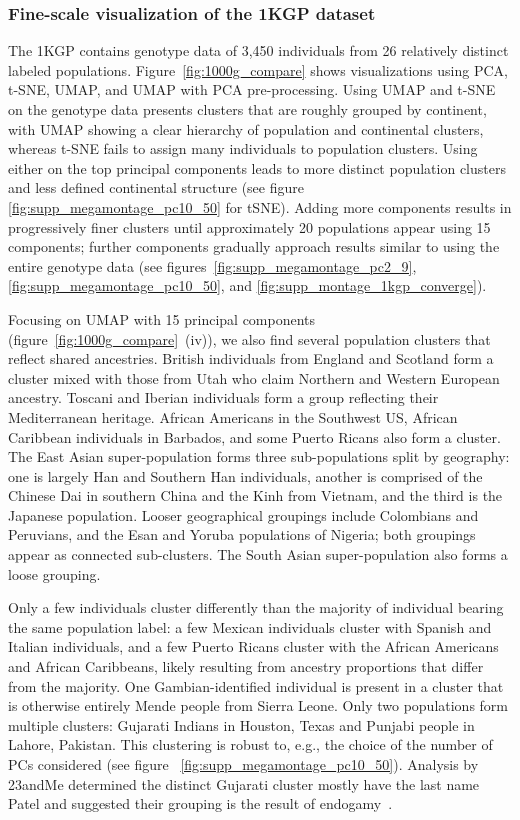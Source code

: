 \documentclass[12pt]{pnas-new}
\begin{document}
\subsubsection*{Fine-scale visualization of the 1KGP dataset} The 1KGP contains genotype data of 3,450 individuals from 26 relatively distinct labeled populations\cite{10002015global}. Figure~\ref{fig:1000g_compare} shows visualizations using PCA, t-SNE, UMAP, and UMAP with PCA pre-processing. Using UMAP and t-SNE on the genotype data presents clusters that are roughly grouped by continent, with UMAP showing a clear hierarchy of population and continental clusters, whereas t-SNE fails to assign many individuals to population clusters. Using either on the top principal components leads to more distinct population clusters and less defined continental structure (see figure \ref{fig:supp_megamontage_pc10_50} for tSNE). Adding more components results in progressively finer clusters until approximately 20 populations appear using 15 components; further components gradually approach results similar to using the entire genotype data (see figures~\ref{fig:supp_megamontage_pc2_9}, \ref{fig:supp_megamontage_pc10_50}, and \ref{fig:supp_montage_1kgp_converge}). 

Focusing on UMAP with 15 principal components (figure~\ref{fig:1000g_compare}~(iv)), we also find several population clusters that reflect shared ancestries. British individuals from England and Scotland form a cluster mixed with those from Utah who claim Northern and Western European ancestry. Toscani and Iberian individuals form a group reflecting their Mediterranean heritage. African Americans in the Southwest US, African Caribbean individuals in Barbados, and some Puerto Ricans also form a cluster. The East Asian super-population forms three sub-populations split by geography: one is largely Han and Southern Han individuals, another is comprised of the Chinese Dai in southern China and the Kinh from Vietnam, and the third is the Japanese population. Looser geographical groupings include Colombians and Peruvians, and the Esan and Yoruba populations of Nigeria; both groupings appear as connected sub-clusters. The South Asian super-population also forms a loose grouping. 

Only a few individuals cluster differently than the majority of individual bearing the same population label: a few Mexican individuals cluster with Spanish and Italian individuals, and a few Puerto Ricans cluster with the African Americans and African Caribbeans, likely resulting from ancestry proportions that differ from the majority. One Gambian-identified individual is present in a cluster that is otherwise entirely Mende people from Sierra Leone. Only two populations form multiple clusters: Gujarati Indians in Houston, Texas and Punjabi people in Lahore, Pakistan. This clustering is robust to, e.g., the choice of the number of PCs considered (see figure ~\ref{fig:supp_megamontage_pc10_50}). Analysis by 23andMe determined the distinct Gujarati cluster mostly have the last name Patel and suggested their grouping is the result of endogamy~\cite{23andme}.
\end{document}
